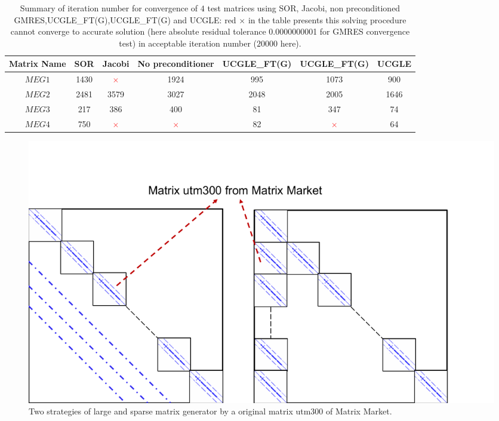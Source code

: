 \begin{table}[htbp]
	\footnotesize
	\renewcommand{\arraystretch}{1.2}
	\caption{Summary of iteration number for convergence of $4$ test matrices using SOR, Jacobi, non preconditioned GMRES,UCGLE\_FT(G),UCGLE\_FT(G) and UCGLE: red $\times$ in the table presents this solving procedure cannot converge to accurate solution (here absolute residual tolerance \num[round-precision=2,round-mode=figures]{0.0000000001} for GMRES convergence test) in acceptable iteration number ($20000$ here).}
	\label{iterations}
	\centering
	\begin{tabular}{*{7}{c}}
		\toprule
		\cellcolor{gray!50}Matrix Name& 	\cellcolor{gray!50}SOR & 	\cellcolor{gray!50}Jacobi & 	\cellcolor{gray!50}No preconditioner & 	\cellcolor{gray!50}UCGLE\_FT(G) &	\cellcolor{gray!50}UCGLE\_FT(G) & 	\cellcolor{gray!50}UCGLE \\
		\midrule
		$MEG1$  & 1430 & \textcolor{red}{$\times$} & 1924 & 995 & 1073 & \cellcolor{yellow}900\\
		
		\cellcolor{gray!20}$MEG2$  & 	\cellcolor{gray!20}2481 & 	\cellcolor{gray!20}3579 & 	\cellcolor{gray!20}3027 & 	\cellcolor{gray!20}2048 & 	\cellcolor{gray!20}2005 & \cellcolor{yellow}1646\\
		
		$MEG3$ & 217 & 386 & 400 & 81 & 347 & \cellcolor{yellow}74\\
		
		\cellcolor{gray!20}	$MEG4$ & 	\cellcolor{gray!20}750 & 	\cellcolor{gray!20}\textcolor{red}{$\times$} & 	\cellcolor{gray!20}\textcolor{red}{$\times$} & 	\cellcolor{gray!20}82 & 	\cellcolor{gray!20}\textcolor{red}{$\times$} & \cellcolor{yellow}64\\
		\bottomrule
	\end{tabular}
\end{table}

\begin{figure}[t]
	\centering
	\includegraphics[width=0.8\linewidth]{fig/matrix_generator.pdf}
	\caption{Two strategies of large and sparse matrix generator by a original matrix utm300 of Matrix Market.}
	\label{fig:matrixgenerator}
\end{figure}

